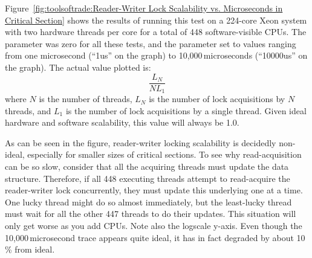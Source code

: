 Figure~\ref{fig:toolsoftrade:Reader-Writer Lock Scalability vs. Microseconds in Critical Section}
shows the results of running this test on a 224-core Xeon system
with two hardware threads per core for a total of 448 software-visible
CPUs.
The  parameter was zero for all these tests, and the
 parameter set to values ranging from one microsecond (``1us''
on the graph) to 10,000\,microseconds (``10000us'' on the graph).
The actual value plotted is:
\begin{equation}
	\frac{L_N}{N L_1}
\end{equation}
where $N$ is the number of threads,
$L_N$ is the number of lock acquisitions by $N$ threads, and
$L_1$ is the number of lock acquisitions by a single thread.
Given ideal hardware and software scalability, this value will always
be 1.0.

As can be seen in the figure, reader-writer locking scalability is
decidedly non-ideal, especially for smaller sizes of critical
sections.
To see why read-acquisition can be so slow, consider
that all the acquiring threads must update the 
data structure.
Therefore, if all 448 executing threads attempt to
read-acquire the reader-writer lock concurrently, they must update
this underlying  one at a time.
One lucky thread might do so almost immediately, but the least-lucky
thread must wait for all the other 447 threads to do their updates.
This situation will only get worse as you add CPUs.
Note also the logscale y-axis.
Even though the 10,000\,microsecond trace appears quite ideal, it has
in fact degraded by about 10\,\% from ideal.

